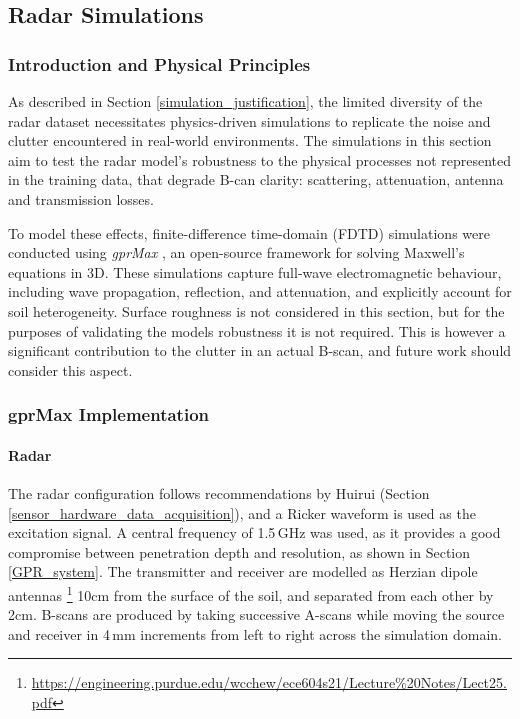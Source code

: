 \subsection{Radar Simulations} \label{compvis_radarsims}

    \subsubsection{Introduction and Physical Principles} \label{rory_radar_principles}
    
        \noindent As described in Section \ref{simulation_justification}, the limited diversity of the radar dataset necessitates physics-driven simulations to replicate the noise and clutter encountered in real-world environments. The simulations in this section aim to test the radar model's robustness to the physical processes not represented in the training data, that degrade B-can clarity: scattering, attenuation, antenna and transmission losses.
        
        \noindent To model these effects, finite-difference time-domain (FDTD) simulations were conducted using \textit{gprMax} \cite{warren2016gprmax}, an open-source framework for solving Maxwell’s equations in 3D. These simulations capture full-wave electromagnetic behaviour, including wave propagation, reflection, and attenuation, and explicitly account for soil heterogeneity. Surface roughness is not considered in this section, but for the purposes of validating the models robustness it is not required. This is however a significant contribution to the clutter in an actual B-scan, and future work should consider this aspect.
     
    
    \subsubsection{gprMax Implementation}

        \paragraph{Radar}
        
             \noindent The radar configuration follows recommendations by Huirui (Section \ref{sensor_hardware_data_acquisition}), and a Ricker waveform is used as the excitation signal. A central frequency of 1.5\,GHz was used, as it provides a good compromise between penetration depth and resolution, as shown in Section \ref{GPR_system}. The transmitter and receiver are modelled as Herzian dipole antennas \footnote{\url{https://engineering.purdue.edu/wcchew/ece604s21/Lecture\%20Notes/Lect25.pdf}} 10cm from the surface of the soil, and separated from each other by 2cm. B-scans are produced by taking successive A-scans while moving the source and receiver in 4\,mm increments from left to right across the simulation domain.
    
